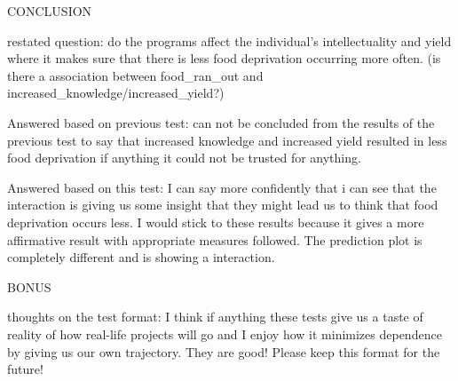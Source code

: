 \documentclass[
]{article}
\begin{document}
CONCLUSION

restated question: do the programs affect the individual's
intellectuality and yield where it makes sure that there is less food
deprivation occurring more often. (is there a association between
food\_ran\_out and increased\_knowledge/increased\_yield?)

Answered based on previous test: can not be concluded from the results
of the previous test to say that increased knowledge and increased yield
resulted in less food deprivation if anything it could not be trusted
for anything.

Answered based on this test: I can say more confidently that i can see
that the interaction is giving us some insight that they might lead us
to think that food deprivation occurs less. I would stick to these
results because it gives a more affirmative result with appropriate
measures followed. The prediction plot is completely different and is
showing a interaction.

BONUS

thoughts on the test format: I think if anything these tests give us a
taste of reality of how real-life projects will go and I enjoy how it
minimizes dependence by giving us our own trajectory. They are good!
Please keep this format for the future!
\end{document}
